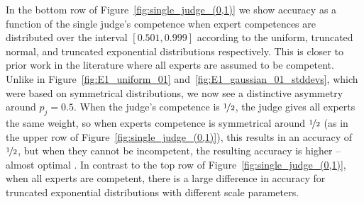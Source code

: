 \documentclass[letterpaper]{article} %
\newtheorem{conjecture}{Conjecture}
\newcommand{\judge}{\ensuremath{j} }
\newcommand{\experts}{\ensuremath{E} }
\newcommand{\omer}[1]{\textcolor{purple}{Omer says: #1}}
\newcommand{\nick}[1]{\todo[color=kentuckyblue!40,size=footnotesize]{Nick says: #1}}
\begin{document}
In the bottom row of Figure~\ref{fig:single_judge_(0,1)} we show accuracy as a function of the single judge's competence when expert competences are distributed over the interval $[0.501, 0.999]$ according to the uniform, truncated normal, and truncated exponential distributions respectively.
%
This is closer to prior work in the literature where all experts are assumed to be competent.
%
Unlike in Figure~\ref{fig:E1_uniform_01} and~\ref{fig:E1_gaussian_01_stddevs}, which were based on symmetrical distributions, we now see a distinctive asymmetry around $p_j = 0.5$. When the judge's competence is $\nicefrac{1}{2}$, the judge gives all experts the same weight, so when experts competence is symmetrical around $\nicefrac{1}{2}$ (as in the upper row of Figure~\ref{fig:single_judge_(0,1)}),
this results in an accuracy of $\nicefrac{1}{2}$, but when they cannot be incompetent, the resulting accuracy is higher -- almost optimal \cite{baharad2022one}.
%
In contrast to the top row of Figure~\ref{fig:single_judge_(0,1)}, when all experts are competent, there is a large difference in accuracy for truncated exponential distributions with different scale parameters.
%


%
\end{document}
